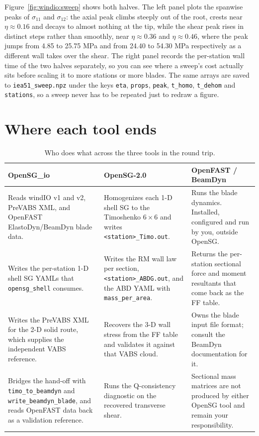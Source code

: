 Figure~\ref{fig:windio:sweep} shows both halves. The left panel plots the
spanwise peaks of $\sigma_{11}$ and $\sigma_{12}$: the axial peak climbs steeply
out of the root, crests near $\eta \approx 0.16$ and decays to almost nothing at
the tip, while the shear peak rises in distinct steps rather than smoothly, near
$\eta \approx 0.36$ and $\eta \approx 0.46$, where the peak jumps from 4.85 to
25.75 MPa and from 24.40 to 54.30 MPa respectively as a different wall takes
over the shear. The right panel records the per-station wall time of the two
halves separately, so you can see where a sweep's cost actually sits before
scaling it to more stations or more blades. The same arrays are saved to
\texttt{iea51\_sweep.npz} under the keys \texttt{eta}, \texttt{props},
\texttt{peak}, \texttt{t\_homo}, \texttt{t\_dehom} and \texttt{stations}, so a
sweep never has to be repeated just to redraw a figure.

\section{Where each tool ends}
\label{sec:windio:whodoeswhat}

\begin{table}[htbp]
\centering
\small
\caption{Who does what across the three tools in the round trip.}
\label{tab:windio:whodoeswhat}
\begin{tabular}{p{}p{}p{}}
\toprule
OpenSG\_io & OpenSG-2.0 & OpenFAST / BeamDyn \\
\midrule
Reads windIO v1 and v2, PreVABS XML, and OpenFAST ElastoDyn/BeamDyn blade data.
&
Homogenizes each 1-D shell SG to the Timoshenko $6\times6$ and writes
\texttt{<station>\_Timo.out}.
&
Runs the blade dynamics. Installed, configured and run by you, outside OpenSG.
\\[4pt]
Writes the per-station 1-D shell SG YAMLs that \texttt{opensg\_shell} consumes.
&
Writes the RM wall law per section, \texttt{<station>\_ABDG.out}, and the ABD
YAML with \texttt{mass\_per\_area}.
&
Returns the per-station sectional force and moment resultants that come back as
the FF table.
\\[4pt]
Writes the PreVABS XML for the 2-D solid route, which supplies the independent
VABS reference.
&
Recovers the 3-D wall stress from the FF table and validates it against that
VABS cloud.
&
Owns the blade input file format; consult the BeamDyn documentation for it.
\\[4pt]
Bridges the hand-off with \texttt{timo\_to\_beamdyn} and
\texttt{write\_beamdyn\_blade}, and reads OpenFAST data back as a validation
reference.
&
Runs the Q-consistency diagnostic on the recovered transverse shear.
&
Sectional mass matrices are not produced by either OpenSG tool and remain your
responsibility.
\\
\bottomrule
\end{tabular}
\end{table}

